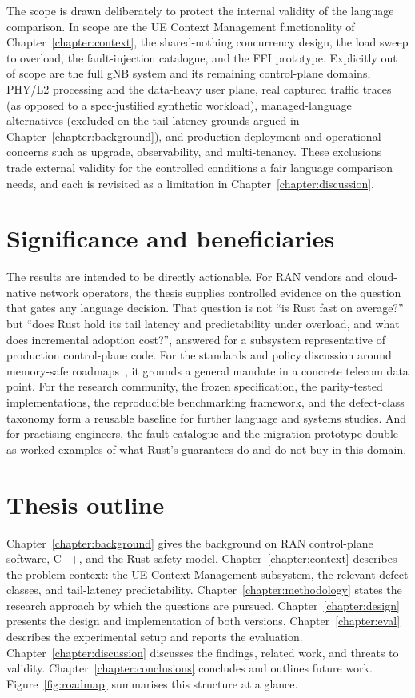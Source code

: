 \documentclass[english,twoside,openright,a4paper,censored,csm,software-track-2020]{HYthesisML}
\begin{document}
The scope is drawn deliberately to protect the internal validity of the language comparison. In
scope are the UE Context Management functionality of Chapter~\ref{chapter:context}, the
shared-nothing concurrency design, the load sweep to overload, the fault-injection catalogue,
and the FFI prototype. Explicitly out of scope are the full gNB system and its remaining
control-plane domains, PHY/L2 processing and the data-heavy user plane, real captured traffic
traces (as opposed to a spec-justified synthetic workload), managed-language alternatives
(excluded on the tail-latency grounds argued in Chapter~\ref{chapter:background}), and
production deployment and operational concerns such as upgrade, observability, and
multi-tenancy. These exclusions trade external validity for the controlled conditions a fair
language comparison needs, and each is revisited as a limitation in
Chapter~\ref{chapter:discussion}.

\section{Significance and beneficiaries}
The results are intended to be directly actionable. For RAN vendors and cloud-native network
operators, the thesis supplies controlled evidence on the question that gates any language
decision. That question is not ``is Rust fast on average?'' but ``does Rust hold its tail latency and
predictability under overload, and what does incremental adoption cost?'', answered for a subsystem
representative of production control-plane code. For the standards and policy discussion around
memory-safe roadmaps~\cite{cisa2023memorysafe,oncd2024building}, it grounds a general mandate in
a concrete telecom data point. For the research community, the frozen specification, the
parity-tested implementations, the reproducible benchmarking framework, and the defect-class
taxonomy form a reusable baseline for further language and systems studies. And for practising
engineers, the fault catalogue and the migration prototype double as worked examples of what
Rust's guarantees do and do not buy in this domain.

\section{Thesis outline}
Chapter~\ref{chapter:background} gives the background on RAN control-plane software, C++,
and the Rust safety model. Chapter~\ref{chapter:context} describes the problem context: the
UE Context Management subsystem, the relevant defect classes, and tail-latency
predictability. Chapter~\ref{chapter:methodology} states the research approach by which the
questions are pursued.
Chapter~\ref{chapter:design} presents the design and implementation of both versions.
Chapter~\ref{chapter:eval} describes the experimental setup and reports the evaluation.
Chapter~\ref{chapter:discussion} discusses the findings, related work, and threats to
validity. Chapter~\ref{chapter:conclusions} concludes and outlines future work.
Figure~\ref{fig:roadmap} summarises this structure at a glance.
\end{document}
